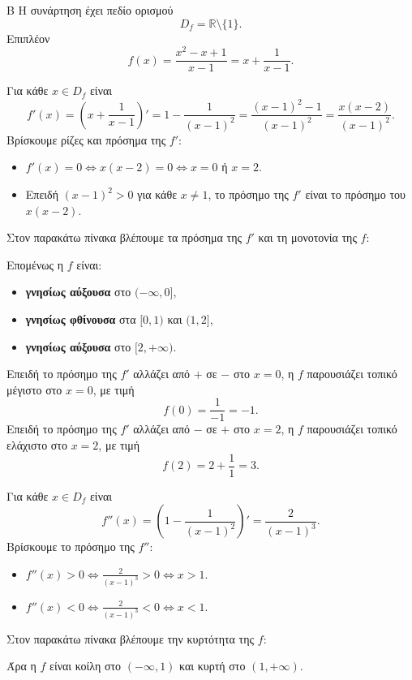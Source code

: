 \begin{thema}{Β}
Η συνάρτηση έχει πεδίο ορισμού
\[
D_f=\mathbb{R}\setminus\{1\}.
\]
Επιπλέον
\[
f(x)=\frac{x^2-x+1}{x-1}=x+\frac{1}{x-1}.
\]
\begin{erwthma}
\item Για κάθε $x\in D_f$ είναι
\[
f'(x)=\left(x+\frac{1}{x-1}\right)'=1-\frac{1}{(x-1)^2}
=\frac{(x-1)^2-1}{(x-1)^2}
=\frac{x(x-2)}{(x-1)^2}.
\]
Βρίσκουμε ρίζες και πρόσημα της $f'$:
\begin{itemize}
\item $f'(x)=0\Leftrightarrow x(x-2)=0\Leftrightarrow x=0$ ή $x=2$.
\item Επειδή $(x-1)^2>0$ για κάθε $x\neq1$, το πρόσημο της $f'$ είναι το πρόσημο του $x(x-2)$.
\end{itemize}
Στον παρακάτω πίνακα βλέπουμε τα πρόσημα της $f'$ και τη μονοτονία της $f$:
\begin{center}
\end{center}
Επομένως η $f$ είναι:
\begin{itemize}
\item \textbf{γνησίως αύξουσα} στο $(-\infty,0]$,
\item \textbf{γνησίως φθίνουσα} στα $[0,1)$ και $(1,2]$,
\item \textbf{γνησίως αύξουσα} στο $[2,+\infty)$.
\end{itemize}
Επειδή το πρόσημο της $f'$ αλλάζει από $+$ σε $-$ στο $x=0$, η $f$ παρουσιάζει τοπικό μέγιστο στο $x=0$, με τιμή
\[
f(0)=\frac{1}{-1}=-1.
\]
Επειδή το πρόσημο της $f'$ αλλάζει από $-$ σε $+$ στο $x=2$, η $f$ παρουσιάζει τοπικό ελάχιστο στο $x=2$, με τιμή
\[
f(2)=2+\frac{1}{1}=3.
\]

\item Για κάθε $x\in D_f$ είναι
\[
f''(x)=\left(1-\frac{1}{(x-1)^2}\right)'=\frac{2}{(x-1)^3}.
\]
Βρίσκουμε το πρόσημο της $f''$:
\begin{itemize}
\item $f''(x)>0\Leftrightarrow \frac{2}{(x-1)^3}>0\Leftrightarrow x>1$.
\item $f''(x)<0\Leftrightarrow \frac{2}{(x-1)^3}<0\Leftrightarrow x<1$.
\end{itemize}
Στον παρακάτω πίνακα βλέπουμε την κυρτότητα της $f$:
\begin{center}
\end{center}
Άρα η $f$ είναι κοίλη στο $(-\infty,1)$ και κυρτή στο $(1,+\infty)$.


\end{erwthma}
\end{thema}

